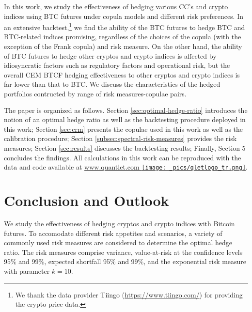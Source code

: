 \documentclass[11pt,a4paper,english]{article}
\begin{document}
In this work, we study the effectiveness of hedging various CC's and
crypto indices using BTC futures under copula models and different
risk preferences. 
In an extensive backtest,\footnote{We thank the data provider
  Tiingo (\href{https://www.tiingo.com/}{https://www.tiingo.com/}) for
  providing the crypto price data.}
 we find the ability of the BTC futures to hedge BTC and BTC-related
 indices promising, regardless of the choices of the copula (with the
 exception of the Frank copula) and risk measure. 
On the other hand, the ability of BTC futures to hedge other cryptos and crypto indices
is affected by idiosyncratic factors such as regulatory factors and operational risk,
but the overall CEM BTCF hedging effectiveness to other cryptos and crypto indices is far lower
than that to BTC.
We discuss the characteristics of the hedged portfolios contructed by range of risk measures-copulae pairs.


The paper is organized as follows. Section \ref{sec:optimal-hedge-ratio} introduces the notion of
an optimal hedge ratio as well as the backtesting procedure deployed in this work;
Section \ref{sec:crm} presents the copulae used in this work as well as the calibration procedure;
Section \ref{subsec:spectral-risk-measures} provides the risk measures;
Section \ref{sec:results} discusses the backtesting results; Finally,
Section 5 concludes the findings. 
All calculations in this work can be reproduced with the data and code
available at \href{http://www.quantlet.com/}{www.quantlet.com
  {\texttt{[image: \_pics/qletlogo\_tr.png]}}}. 



%


\section{Conclusion and Outlook}\label{sec:conclusion-and-outlook}
We study the effectiveness of hedging cryptos and crypto indices with
Bitcoin futures.
To accomodate different risk appetites and scenarios, a variety of
commonly used risk measures are considered to determine the optimal
hedge ratio. The risk measures comprise variance, value-at-risk at
the confidence levels 95\% and 99\%, expected shortfall 95\% and 99\%,
and the exponential risk measure with parameter $k=10$.
\end{document}
